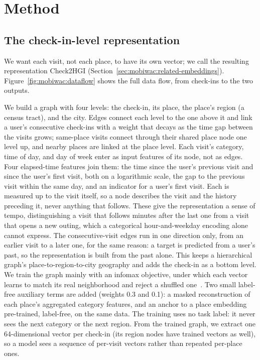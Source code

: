\section{Method}
\label{sec:mobiwac:method}

\subsection{The check-in-level representation}
\label{sec:mobiwac:method-rep}

We want each visit, not each place, to have its own vector; we call the resulting representation Check2HGI (Section~\ref{sec:mobiwac:related-embeddings}).
Figure~\ref{fig:mobiwac:dataflow} shows the full data flow, from check-ins to the two outputs.

We build a graph with four levels: the check-in, its place, the place's region (a census tract), and the city. Edges connect each level to the one above it and link a user's consecutive check-ins with a weight that decays as the time gap between the visits grows; same-place visits connect through their shared place node one level up, and nearby places are linked at the place level. Each visit's category, time of day, and day of week enter as input features of its node, not as edges. Four elapsed-time features join them: the time since the user's previous visit and since the user's first visit, both on a logarithmic scale, the gap to the previous visit within the same day, and an indicator for a user's first visit. Each is measured up to the visit itself, so a node describes the visit and the history preceding it, never anything that follows. These give the representation a sense of tempo, distinguishing a visit that follows minutes after the last one from a visit that opens a new outing, which a categorical hour-and-weekday encoding alone cannot express. The consecutive-visit edges run in one direction only, from an earlier visit to a later one, for the same reason: a target is predicted from a user's past, so the representation is built from the past alone. This keeps a hierarchical graph's place-to-region-to-city geography and adds the check-in as a bottom level. We train the graph mainly with an infomax objective, under which each vector learns to match its real neighborhood and reject a shuffled one~\cite{velickovic2019deep,huang2023hgi}. Two small label-free auxiliary terms are added (weights 0.3 and 0.1): a masked reconstruction of each place's aggregated category
features, and an anchor to a place embedding pre-trained, label-free,
on the same data. The training
uses no task label: it
never sees the next category or the next region. From the trained graph, we extract one 64-dimensional vector per check-in (its region nodes have trained vectors as well), so a model sees a sequence of per-visit vectors rather than repeated per-place ones.


